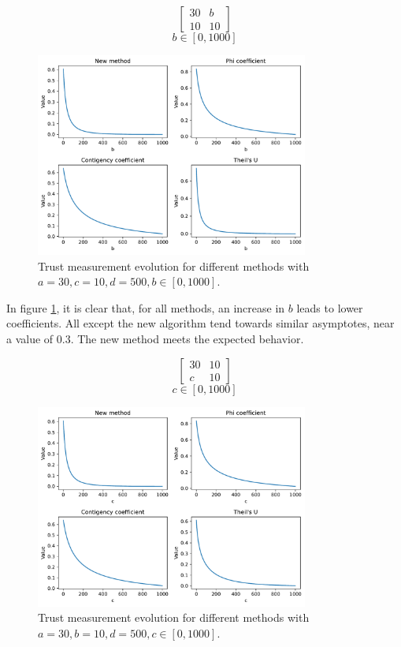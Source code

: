 $$
\begin{bmatrix}
    30 & b \\ 10 & 10
\end{bmatrix}
$$
$$
b \in [0, 1000]
$$
\begin{figure}[h!]
\centering
    \includegraphics[width=0.8\textwidth]{figures/chapter4/cell/trust_tests/2_a.pdf}
    \caption{Trust measurement evolution for different methods with $a=30, c=10, d=500, b \in [0, 1000]$.}
    \label{fig:trust_test_2_a}
\end{figure}
\FloatBarrier

In figure \ref{fig:trust_test_2_a}, it is clear that, for all methods, an increase in $b$ leads to lower coefficients. All except the new algorithm tend towards similar asymptotes, near a value of 0.3. The new method meets the expected behavior.

$$
\begin{bmatrix}
    30 & 10 \\ c & 10
\end{bmatrix}
$$
$$
c \in [0, 1000]
$$
\begin{figure}[h!]
\centering
    \includegraphics[width=0.8\textwidth]{figures/chapter4/cell/trust_tests/2_b.pdf}
    \caption{Trust measurement evolution for different methods with $a=30, b=10, d=500, c \in [0, 1000]$.}
    \label{fig:trust_test_2_b}
\end{figure}
\FloatBarrier

